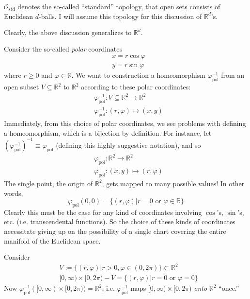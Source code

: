 \documentclass[10pt, twoside]{amsart}
\begin{document}
\begin{multicols*}{2}
$\mathcal{O}_{\text{std}}$ denotes the so-called ``standard'' topology, that open sets consists of Euclidean $d$-balls.  I will assume this topology for this discussion of $\mathbb{R}^d$'s.  

Clearly, the above discussion generalizes to $\mathbb{R}^d$.  

Consider the so-called \emph{polar} coordinates 
\begin{equation}\label{Eq:R2polarcoordinates}
\begin{aligned}
  & x = r\cos{\varphi} \\ 
  & y = r\sin{\varphi}
\end{aligned}
\end{equation}
where $r\geq 0$ and $\varphi \in \mathbb{R}$.  We want to construction a homeomorphism $\varphi^{-1}_{\text{pol}}$ from an open subset $V \subseteq \mathbb{R}^2$ to $\mathbb{R}^2$ according to these polar coordinates:
\[
\begin{aligned}
  & \varphi_{\text{pol}}^{-1}: V \subseteq \mathbb{R}^2 \to \mathbb{R}^2 \\ 
  & \varphi^{-1}_{\text{pol}}:(r,\varphi) \mapsto (x,y)
\end{aligned}
\]
Immediately, from this choice of polar coordinates, we see problems with defining a homeomorphism, which is a bijection by definition.  For instance, let $(\varphi_{\text{pol}}^{-1})^{-1} \equiv \varphi_{\text{pol}}$ (defining this highly suggestive notation), and so 
\[
\begin{aligned}
  & \varphi_{\text{pol}}:\mathbb{R}^2 \to \mathbb{R}^2 \\ 
  & \varphi_{\text{pol}}:(x,y) \mapsto (r,\varphi)
\end{aligned}
\]
The single point, the origin of $\mathbb{R}^2$, gets mapped to many possible values! In other words,
\[
\varphi_{\text{pol}}(0,0) = \lbrace (r,\varphi) | r=0 \text{ or } \varphi \in \mathbb{R} \rbrace
\]
Clearly this must be the case for any kind of coordinates involving $\cos$'s, $\sin$'s, etc. (i.e. transcendental functions).  So the choice of these kinds of coordinates necessitate giving up on the possibility of a single chart covering the entire manifold of the Euclidean space.  

Consider 
\[
\begin{aligned}
  & V := \lbrace (r,\varphi) | r>0, \varphi \in (0,2\pi) \rbrace \subset \mathbb{R}^2 \\ 
  & [0,\infty) \times [0,2\pi ) - V = \lbrace (r,\varphi) | r = 0 \text{ or } \varphi = 0 \rbrace
\end{aligned}
\]
Now $\varphi_{\text{pol}}^{-1}( [0,\infty) \times [0,2\pi)) = \mathbb{R}^2$, i.e. $\varphi_{\text{pol}}^{-1}$ maps $[0,\infty) \times [0,2\pi)$ \emph{onto} $\mathbb{R}^2$ ``once.''  


\end{multicols*}
\end{document}
